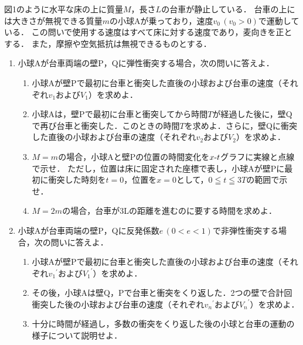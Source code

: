 

図1のように水平な床の上に質量$M$，長さ$L$の台車が静止している．
台車の上には大きさが無視できる質量$m$の小球Aが乗っており，速度$v_0\,(v_0>0)$で運動している．
この問いで使用する速度はすべて床に対する速度であり，麦向きを正とする．
また，摩擦や空気抵抗は無視できるものとする．

\begin{enumerate}[（1）]
  \setlength{\leftskip}{-1.5zw}
  \setlength{\itemindent}{1zw}\setlength{\labelsep}{0.5zw}
  \setlength{\labelwidth}{1zw}\setlength{\leftmargin}{1zw}
  \setlength{\itemsep}{0.5\baselineskip}
  \item 小球Aが台車両端の壁P，Qに弾性衝突する場合，次の問いに答えよ．
  \begin{enumerate}[（a）]
    \setlength{\leftskip}{-2.5zw}
    \setlength{\itemindent}{1zw}\setlength{\labelsep}{1zw}
    \setlength{\labelwidth}{1zw}
    \item 小球Aが壁Pで最初に台車と衝突した直後の小球および台車の速度（それぞれ$v_1$および$V_1$）を求めよ．
    \item 小球Aは，壁Pで最初に台車と衝突してから時間$T$が経過した後に，壁Qで再び台車と衝突した．このときの時間$T$を求めよ．さらに，壁Qに衝突した直後の小球および台車の速度（それぞれ$v_2$および$V_2$）を求めよ．
    \item $M=m$の場合，小球Aと壁Pの位置の時間変化を$x\mathchar`-t$グラフに実線と点線で示せ．
    ただし，位置は床に固定された座標\x で表し，小球Aが壁Pに最初に衝突した時刻を$t=0$，位置を$x=0$として，$0\leqq t\leqq 3T$の範囲で示せ．
    \item $M=2m$の場合，台車が3Lの距離を進むのに要する時間を求めよ．
  \end{enumerate}
  \item 小球Aが台車両端の壁P，Qに反発係数$e\,(0<e<1)$で非弾性衝突する場合，次の問いに答えよ．
  \begin{enumerate}[（a）]
    \setlength{\leftskip}{-2.5zw}
    \setlength{\itemindent}{1zw}\setlength{\labelsep}{1zw}
    \setlength{\labelwidth}{1zw}
    \item 小球Aが壁Pで最初に台車と衝突した直後の小球および台車の速度（それぞれ${v_1}^\prime$および${V_1}^\prime$）を求めよ．
    \item その後，小球Aは壁Q，Pで台車と衝突をくり返した．2つの壁で合計\nn 回衝突した後の小球および台車の速度（それぞれ${v_n}^\prime$および${V_n}^\prime$）を求めよ．
    \item 十分に時間が経過し，多数の衝突をくり返した後の小球と台車の運動の様子について説明せよ．
  \end{enumerate}
\end{enumerate}


